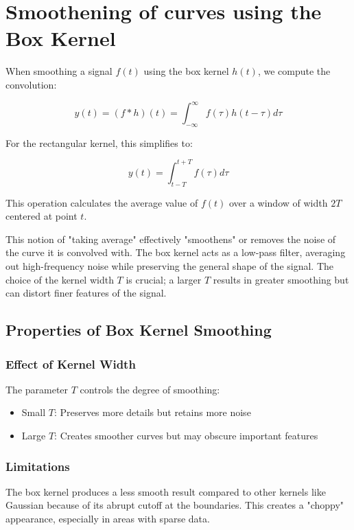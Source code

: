 \documentclass{article}
\begin{document}
\section{Smoothening of curves using the Box Kernel}

When smoothing a signal $f(t)$ using the box kernel $h(t)$, we compute the convolution:

$$
y(t) = (f * h)(t) = \int_{-\infty}^{\infty} f(\tau) h(t - \tau) d\tau
$$

For the rectangular kernel, this simplifies to:

$$
y(t) = \int_{t-T}^{t+T} f(\tau) d\tau
$$

This operation calculates the average value of $f(t)$ over a window of width $2T$ centered at point $t$. 
\newline\newline

This notion of "taking average" effectively "smoothens" or removes the noise of the curve it is convolved with. The box kernel acts as a low-pass filter, averaging out high-frequency noise while preserving the general shape of the signal. The choice of the kernel width $T$ is crucial; a larger $T$ results in greater smoothing but can distort finer features of the signal.

\subsection{Properties of Box Kernel Smoothing}

\subsubsection{Effect of Kernel Width}

The parameter $T$ controls the degree of smoothing:
\begin{itemize}
    \item Small $T$: Preserves more details but retains more noise
    \item Large $T$: Creates smoother curves but may obscure important features
\end{itemize}

\subsubsection{Limitations}

The box kernel produces a less smooth result compared to other kernels like Gaussian because of its abrupt cutoff at the boundaries. This creates a "choppy" appearance, especially in areas with sparse data.
\end{document}
